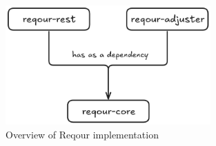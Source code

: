 \documentclass[../main.tex]{subfiles}
\begin{document}
\begin{figure}
  \begin{center}
    \includegraphics[width=0.7\textwidth]{images/reqour-modules.png}
  \end{center}
  \caption{Overview of Reqour implementation}
  \label{fig:reqour-modules}
\end{figure}
\end{document}
